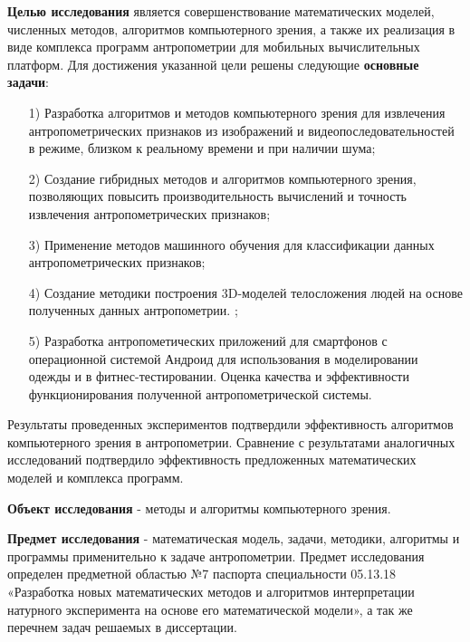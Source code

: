 \textbf{Целью исследования} является совершенствование математических моделей, численных методов, алгоритмов компьютерного зрения, а также их реализация в виде комплекса программ антропометрии для мобильных вычислительных платформ. Для достижения указанной цели решены следующие \textbf {основные задачи}:
\begin{enumerate}
	\item[1)] Разработка алгоритмов и методов компьютерного зрения для извлечения антропометрических признаков из изображений и видеопоследовательностей в режиме, близком к реальному времени и при наличии шума;
	\item[2)] Создание гибридных методов и алгоритмов компьютерного зрения, позволяющих повысить производительность вычислений и точность извлечения антропометрических признаков;
	\item[3)] Применение методов машинного обучения для классификации данных антропометрических признаков;
	\item[4)] Создание методики построения 3D-моделей телосложения людей на основе полученных данных антропометрии. ;
	\item[5)] Разработка антропометических приложений для смартфонов с операционной системой Андроид для использования в моделировании одежды и в фитнес-тестировании. Оценка качества и эффективности функционирования полученной антропометрической системы.
\end{enumerate}
Результаты проведенных экспериментов подтвердили эффективность алгоритмов компьютерного зрения в антропометрии. Сравнение с результатами аналогичных исследований подтвердило эффективность предложенных математических моделей и комплекса программ.

\textbf{Объект исследования} - методы и алгоритмы компьютерного зрения.

\textbf{Предмет исследования} - математическая модель, задачи, методики, алгоритмы и программы применительно к задаче антропометрии. Предмет исследования определен предметной областью №7 паспорта специальности 05.13.18 «Разработка новых математических методов и алгоритмов интерпретации натурного эксперимента на основе его математической модели», а так же перечнем задач решаемых в диссертации.

